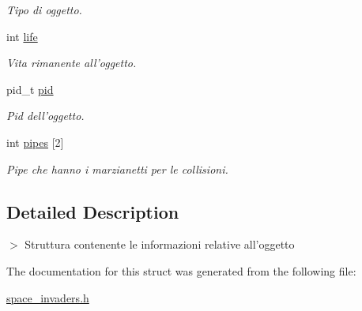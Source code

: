 \begin{DoxyCompactItemize}
\begin{DoxyCompactList}\small\item\em Tipo di oggetto. \item\end{DoxyCompactList}\item 
\hypertarget{structobject__data__t_af1092c54c97d271905181362ea8cbd78}{
int \hyperlink{structobject__data__t_af1092c54c97d271905181362ea8cbd78}{life}}
\label{structobject__data__t_af1092c54c97d271905181362ea8cbd78}

\begin{DoxyCompactList}\small\item\em Vita rimanente all'oggetto. \item\end{DoxyCompactList}\item 
\hypertarget{structobject__data__t_a050d5314c9aa819ccc31ec8b98dd70a7}{
pid\_\-t \hyperlink{structobject__data__t_a050d5314c9aa819ccc31ec8b98dd70a7}{pid}}
\label{structobject__data__t_a050d5314c9aa819ccc31ec8b98dd70a7}

\begin{DoxyCompactList}\small\item\em Pid dell'oggetto. \item\end{DoxyCompactList}\item 
\hypertarget{structobject__data__t_af7c955cf485e14a222d902e1af85438f}{
int \hyperlink{structobject__data__t_af7c955cf485e14a222d902e1af85438f}{pipes} \mbox{[}2\mbox{]}}
\label{structobject__data__t_af7c955cf485e14a222d902e1af85438f}

\begin{DoxyCompactList}\small\item\em Pipe che hanno i marzianetti per le collisioni. \item\end{DoxyCompactList}\end{DoxyCompactItemize}


\subsection{Detailed Description}
$>$ Struttura contenente le informazioni relative all'oggetto 

The documentation for this struct was generated from the following file:\begin{DoxyCompactItemize}
\item 
\hyperlink{space__invaders_8h}{space\_\-invaders.h}\end{DoxyCompactItemize}
